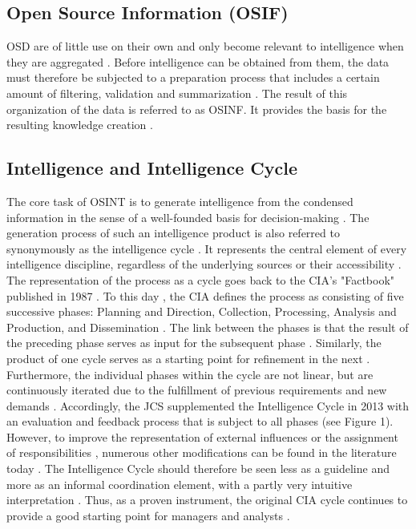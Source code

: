 \documentclass[10pt]{article}
\begin{document}
\subsection{Open Source Information (OSIF)}

OSD are of little use on their own and only become relevant to intelligence when they
are aggregated \cite{Williams.2018}. Before intelligence can be obtained from them, the
data must therefore be subjected to a preparation process that includes a certain amount
of filtering, validation and summarization
\cite{DosPassos.2017, NorthAtlanticTreatyOrganization.2001}. The result of this organization
of the data \cite{Schaurer.2010} is referred to as OSINF. It provides the basis for the
resulting knowledge creation \cite{DosPassos.2017,Schaurer.2010}.

\subsection{Intelligence and Intelligence Cycle}

The core task of OSINT is to generate intelligence \cite{Hwang.2022,Dokman.2020}
from the condensed information in the sense of a well-founded basis for decision-making
\cite{Breakspear.2013,May.2020}. The generation process of such an intelligence product
is also referred to synonymously as the intelligence cycle
\cite{HerreraCubides.2020, CentralIntelligenceAgency.1987}. It represents the central
element of every intelligence discipline, regardless of the underlying sources or their
accessibility \cite{Reuser.2017,Dokman.2020}. The representation of the process as a cycle
\cite{DirectorofNationalIntelligence.2011} goes back to the CIA's "Factbook" published in
1987 \cite{CentralIntelligenceAgency.1987}. To this day \cite{CentralIntelligenceAgency.2023},
the CIA defines the process as consisting of five successive phases: Planning and Direction,
Collection, Processing, Analysis and Production, and Dissemination
\cite{CentralIntelligenceAgency.1987}. The link between the phases is that the result of the
preceding phase serves as input for the subsequent phase
\cite{JointChiefsofStaffU.S.Army.2013,Pellissier.2013}. Similarly, the product of one cycle
serves as a starting point for refinement in the next \cite{Dokman.2020,Gibson.2016}.
Furthermore, the individual phases within the cycle are not linear, but are continuously
iterated due to the fulfillment of previous requirements and new demands \cite{Gibson.2016}.
Accordingly, the JCS supplemented the Intelligence Cycle in 2013 with an evaluation and
feedback process that is subject to all phases \cite{JointChiefsofStaffU.S.Army.2013}
(see Figure 1). However, to improve the representation of external influences or the
assignment of responsibilities \cite{Lowenthal.2020,Phythian.2013,Johnston.2005}, numerous
other modifications can be found in the literature today \cite{Bohm.2021,Reuser.2017}. The
Intelligence Cycle should therefore be seen less as a guideline and more as an informal
coordination element, with a partly very intuitive \cite{Breakspear.2013} interpretation
\cite{Hwang.2022}. Thus, as a proven instrument, the original CIA cycle continues to provide
a good starting point for managers and analysts
\cite{Lowenthal.2020, NorthAtlanticTreatyOrganization.2001}.
\end{document}
